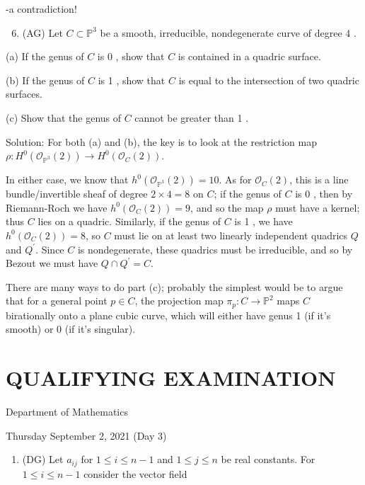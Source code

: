 \documentclass[10pt]{article}
\begin{document}
-a contradiction!

\begin{enumerate}
  \setcounter{enumi}{5}
  \item (AG) Let $C \subset \mathbb{P}^{3}$ be a smooth, irreducible, nondegenerate curve of degree 4 .
\end{enumerate}

(a) If the genus of $C$ is 0 , show that $C$ is contained in a quadric surface.

(b) If the genus of $C$ is 1 , show that $C$ is equal to the intersection of two quadric surfaces.

(c) Show that the genus of $C$ cannot be greater than 1 .

Solution: For both (a) and (b), the key is to look at the restriction map $\rho: H^{0}\left(\mathcal{O}_{\mathbb{P}^{3}}(2)\right) \rightarrow H^{0}\left(\mathcal{O}_{C}(2)\right)$.

In either case, we know that $h^{0}\left(\mathcal{O}_{\mathbb{P}^{3}}(2)\right)=10$. As for $\mathcal{O}_{C}(2)$, this is a line bundle/invertible sheaf of degree $2 \times 4=8$ on $C$; if the genus of $C$ is 0 , then by Riemann-Roch we have $h^{0}\left(\mathcal{O}_{C}(2)\right)=9$, and so the map $\rho$ must have a kernel; thus $C$ lies on a quadric. Similarly, if the genus of $C$ is 1 , we have $h^{0}\left(\mathcal{O}_{C}(2)\right)=8$, so $C$ must lie on at least two linearly independent quadrics $Q$ and $Q^{\prime}$. Since $C$ is nondegenerate, these quadrics must be irreducible, and so by Bezout we must have $Q \cap Q^{\prime}=C$.

There are many ways to do part (c); probably the simplest would be to argue that for a general point $p \in C$, the projection map $\pi_{p}: C \rightarrow \mathbb{P}^{2}$ maps $C$ birationally onto a plane cubic curve, which will either have genus 1 (if it's smooth) or 0 (if it's singular).

\section*{QUALIFYING EXAMINATION }
Department of Mathematics

Thursday September 2, 2021 (Day 3)

\begin{enumerate}
  \item (DG) Let $a_{i j}$ for $1 \leq i \leq n-1$ and $1 \leq j \leq n$ be real constants. For $1 \leq i \leq n-1$ consider the vector field
\end{enumerate}
\end{document}
